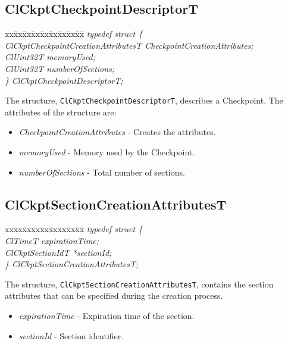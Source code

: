 \begin{flushleft}
\subsection{ClCkptCheckpointDescriptorT}
\begin{tabbing}
xx\=xx\=xx\=xx\=xx\=xx\=xx\=xx\=xx\=\kill
\textit{typedef struct \{}\\
\>\>\>\>\textit{ClCkptCheckpointCreationAttributesT CheckpointCreationAttributes;}\\
\>\>\>\>\textit{ClUint32T memoryUsed;}\\
\>\>\>\>\textit{ClUint32T numberOfSections;}\\
\textit{\} ClCkptCheckpointDescriptorT;}\end{tabbing}
The structure, {\tt{ClCkptCheckpointDescriptorT}}, describes a Checkpoint. The attributes of the structure are:
\begin{itemize}
\item
\textit{CheckpointCreationAttributes} - Creates the attributes.
\item
\textit{memoryUsed} - Memory used by the Checkpoint.
\item
\textit{numberOfSections} - Total number of sections.
\end{itemize}


\subsection{ClCkptSectionCreationAttributesT}
\begin{tabbing}
xx\=xx\=xx\=xx\=xx\=xx\=xx\=xx\=xx\=\kill
\textit{typedef struct \{}\\
\>\>\>\>\textit{ClTimeT expirationTime;}\\
\>\>\>\>\textit{ClCkptSectionIdT *sectionId;}\\
\textit{\} ClCkptSectionCreationAttributesT;}\end{tabbing}
The structure, {\tt{ClCkptSectionCreationAttributesT}}, contains the section attributes that can be specified during
the creation process.
\begin{itemize}
\item
\textit{expirationTime} - Expiration time of the section.
\item
\textit{sectionId} - Section identifier.
\end{itemize}




\end{flushleft}

